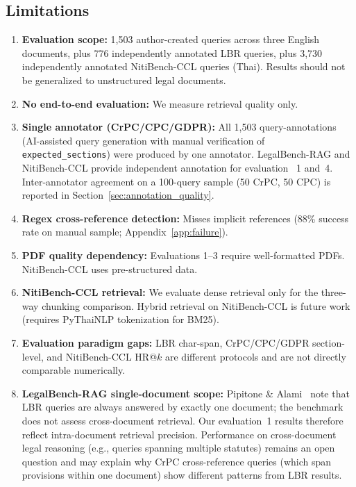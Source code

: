 \documentclass[sn-mathphys,Numbered]{sn-jnl}%
\begin{document}
\subsection{Limitations}

\begin{enumerate}
\item \textbf{Evaluation scope:}  1,503 author-created queries across three
      English documents, plus 776 independently annotated LBR queries, plus
      3,730 independently annotated NitiBench-CCL queries (Thai).  Results
      should not be generalized to unstructured legal documents.
\item \textbf{No end-to-end evaluation:}  We measure retrieval quality
      only.
\item \textbf{Single annotator (CrPC/CPC/GDPR):}  All 1,503
      query-annotations (AI-assisted query generation with manual
      verification of \texttt{expected\_sections}) were produced by one
      annotator.  LegalBench-RAG and NitiBench-CCL provide independent
      annotation for evaluation ~1 and~4.  Inter-annotator agreement on a
      100-query sample (50 CrPC, 50 CPC) is reported in
      Section~\ref{sec:annotation_quality}.
\item \textbf{Regex cross-reference detection:}  Misses implicit references
      (88\% success rate on manual sample; Appendix~\ref{app:failure}).
\item \textbf{PDF quality dependency:}  Evaluations 1--3 require well-formatted
      PDFs.  NitiBench-CCL uses pre-structured data.
\item \textbf{NitiBench-CCL retrieval:}  We evaluate dense retrieval only
      for the three-way chunking comparison.  Hybrid retrieval on
      NitiBench-CCL is future work (requires PyThaiNLP tokenization for
      BM25).
\item \textbf{Evaluation paradigm gaps:}  LBR char-span, CrPC/CPC/GDPR
      section-level, and NitiBench-CCL HR@$k$ are different protocols and
      are not directly comparable numerically.
\item \textbf{LegalBench-RAG single-document scope:}
      Pipitone \& Alami~\cite{pipitone2024legalbenchragbenchmarkretrievalaugmentedgeneration} note that LBR queries are always
      answered by exactly one document; the benchmark does not assess
      cross-document retrieval.  Our evaluation~1 results therefore reflect
      intra-document retrieval precision.  Performance on cross-document
      legal reasoning (e.g., queries spanning multiple statutes) remains
      an open question and may explain why CrPC cross-reference queries
      (which span provisions within one document) show different patterns
      from LBR results.
\end{enumerate}
\end{document}
